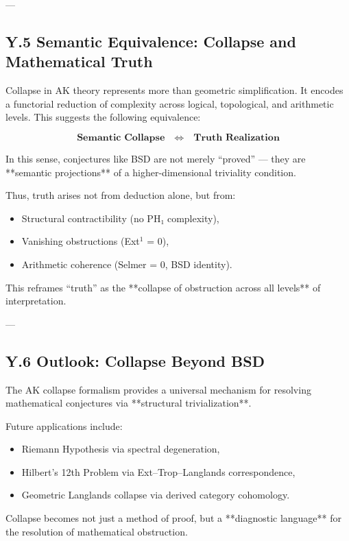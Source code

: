 ---

\subsection*{Y.5 Semantic Equivalence: Collapse and Mathematical Truth}

Collapse in AK theory represents more than geometric simplification.  
It encodes a functorial reduction of complexity across logical, topological, and arithmetic levels.  
This suggests the following equivalence:

\[
\textbf{Semantic Collapse} \quad \Longleftrightarrow \quad \textbf{Truth Realization}
\]

In this sense, conjectures like BSD are not merely “proved” —  
they are **semantic projections** of a higher-dimensional triviality condition.

Thus, truth arises not from deduction alone, but from:
\begin{itemize}
  \item Structural contractibility (no PH₁ complexity),
  \item Vanishing obstructions (Ext$^1$ = 0),
  \item Arithmetic coherence (Selmer = 0, BSD identity).
\end{itemize}

This reframes “truth” as the **collapse of obstruction across all levels** of interpretation.

---

\subsection*{Y.6 Outlook: Collapse Beyond BSD}

The AK collapse formalism provides a universal mechanism  
for resolving mathematical conjectures via **structural trivialization**.  

Future applications include:
\begin{itemize}
  \item Riemann Hypothesis via spectral degeneration,
  \item Hilbert’s 12th Problem via Ext–Trop–Langlands correspondence,
  \item Geometric Langlands collapse via derived category cohomology.
\end{itemize}

Collapse becomes not just a method of proof,  
but a **diagnostic language** for the resolution of mathematical obstruction.

